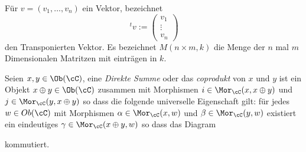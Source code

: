 Für $v=(v_1,\dots,v_n)$ ein Vektor, bezeichnet 
\[
\,^tv:= \begin{pmatrix}
  v_{1}\\
  \vdots\\
  v_{n}
\end{pmatrix}
\]
den Transponierten Vektor. Es bezeichnet $M(n\times m,k)$ die Menge der $n$ mal
$m$ Dimensionalen Matritzen mit einträgen in $k$.

\begin{defn} \cite[4(Categories).5.1]{stacks-project}
Seien $x,y\in \Ob(\cC)$, eine \emph{Direkte Summe} oder das \emph{coprodukt}
von $x$ und $y$ ist ein Objekt $x\oplus y\in \Ob(\cC)$ zusammen mit
Morphismen $i\in\Mor_\cC(x,x\oplus y)$ und $j\in\Mor_\cC(y,x\oplus y)$ so
dass die folgende universelle Eigenschaft gilt: für jedes $w\in Ob(\cC)$ mit
Morphismen $\alpha\in\Mor_\cC(x,w)$ und $\beta\in\Mor_\cC(y,w)$ existiert ein
eindeutiges $\gamma\in\Mor_\cC(x\oplus y,w)$ so dass das Diagram
\begin{center}
\end{center}
kommutiert.
\end{defn}

